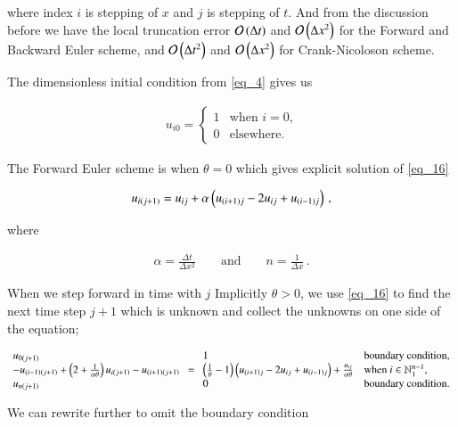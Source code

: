 \documentclass[11pt,english,a4paper]{article}
\begin{document}
\begin{flushleft}
where index $i$ is stepping of $x$ and $j$ is stepping of $t$. And from the discussion before we have the local truncation error $\mathcal{O}\left({\Delta t}\right)$ and $\mathcal{O}\left({\Delta x^2}\right)$ for the Forward and Backward Euler scheme, and $\mathcal{O}\left({\Delta t^2}\right)$ and $\mathcal{O}\left({\Delta x^2}\right)$ for Crank-Nicoloson scheme. \linebreak

The dimensionless initial condition from \eqref{eq_4} gives us

\begin{align*}
u_{i0} = \begin{cases} 1 & \text{when $i=0$,} \\ 0 & \text{elsewhere.} \end{cases} 
\end{align*}

The Forward Euler scheme is when $\theta = 0$ which gives explicit solution of \eqref{eq_16}

\begin{align}
u_{i(j+1)} = u_{ij} + \alpha\left({u_{(i+1)j} - 2 u_{ij} + u_{(i-1)j}}\right) \,,
\label{eq_17}
\end{align} 

where

\begin{align*}
\alpha = \frac{\Delta t}{\Delta x^2} \qquad \text{and} \qquad n = \frac{1}{\Delta x} \,.
\end{align*}

When we step forward in time with $j$ Implicitly $\theta > 0$, we use \eqref{eq_16} to find the next time step $j+1$ which is unknown and collect the unknowns on one side of the equation;

\begin{align*}
\begin{array}{l} u_{0(j+1)} \\ -u_{(i-1)(j+1)} +\left({2+\frac{1}{\alpha \theta}}\right)u_{i(j+1)} - u_{(i+1)(j+1)} \\ u_{n(j+1)}\end{array} = \begin{array}{ll} 1 & \text{boundary condition,} \\ \left({\frac{1}{\theta}-1}\right)\left({u_{(i+1)j} - 2u_{ij} + u_{(i-1)j}}\right) + \frac{u_{ij}}{\alpha\theta} & \text{when $i\in\mathbb{N}_1^{n-1}$,}\\ 0  & \text{boundary condition.}\end{array}
\end{align*} 

We can rewrite further to omit the boundary condition


\end{flushleft}
\end{document}
